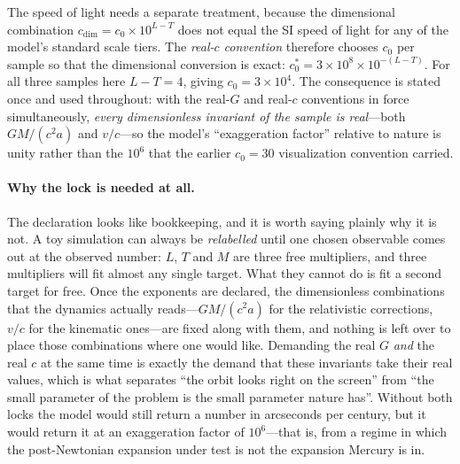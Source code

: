 \documentclass[aps,reprint,amsmath,amssymb,nofootinbib,superscriptaddress,floatfix]{revtex4-2}
\begin{document}
The speed of light needs a separate treatment, because the dimensional
combination $c_{\mathrm{dim}}=c_0\times10^{L-T}$ does not equal the SI
speed of light for any of the model's standard scale tiers.
The \emph{real-$c$ convention} therefore chooses $c_0$ per sample so
that the dimensional conversion is exact:
$c_{0}^{*}=3\times10^{8}\times10^{-(L-T)}$.
For all three samples here $L-T=4$, giving
$c_0=3\times10^{4}$.
The consequence is stated once and used throughout: with the real-$G$
and real-$c$ conventions in force simultaneously, \emph{every
dimensionless invariant of the sample is real}---both $GM/(c^{2}a)$
and $v/c$---so the model's ``exaggeration factor'' relative to nature
is unity rather than the $10^{6}$ that the earlier $c_0=30$
visualization convention carried.

\paragraph*{Why the lock is needed at all.}
The declaration looks like bookkeeping, and it is worth saying plainly
why it is not.
A toy simulation can always be \emph{relabelled} until one chosen
observable comes out at the observed number: $L$, $T$ and $M$ are three
free multipliers, and three multipliers will fit almost any single
target.
What they cannot do is fit a second target for free.
Once the exponents are declared, the dimensionless combinations that
the dynamics actually reads---$GM/(c^{2}a)$ for the relativistic
corrections, $v/c$ for the kinematic ones---are fixed along with them,
and nothing is left over to place those combinations where one would
like.
Demanding the real $G$ \emph{and} the real $c$ at the same time is
exactly the demand that these invariants take their real values, which
is what separates ``the orbit looks right on the screen'' from ``the
small parameter of the problem is the small parameter nature has''.
Without both locks the model would still return a number in arcseconds
per century, but it would return it at an exaggeration factor of
$10^{6}$---that is, from a regime in which the post-Newtonian expansion
under test is not the expansion Mercury is in.
\end{document}
